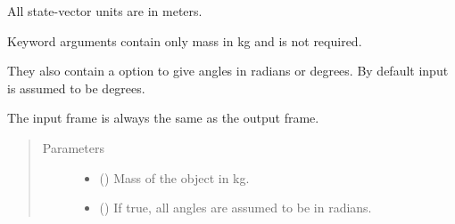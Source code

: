 \documentclass[letterpaper,10pt,english]{sphinxmanual}
\begin{document}
\begin{fulllineitems}
\begin{fulllineitems}
\begin{quote}
\begin{description}
\begin{itemize}
\end{itemize}

\end{description}\end{quote}

\end{fulllineitems}


\begin{fulllineitems}
\label{\detokenize{modules/propagator_kepler:propagator_kepler.PropagatorKepler.get_orbit_cart}}

All state-vector units are in meters.

Keyword arguments contain only mass  in kg and is not required.

They also contain a option to give angles in radians or degrees. By default input is assumed to be degrees.


The input frame is always the same as the output frame.
\begin{quote}\begin{description}
\item[{Parameters}] \leavevmode\begin{itemize}
\item {} 
 () \textendash{} Mass of the object in kg.

\item {} 
 () \textendash{} If true, all angles are assumed to be in radians.

\end{itemize}

\end{description}\end{quote}

\end{fulllineitems}


\begin{fulllineitems}
\label{\detokenize{modules/propagator_kepler:propagator_kepler.PropagatorKepler.output_to_input_frame}}
\end{fulllineitems}


\end{fulllineitems}
\end{document}
